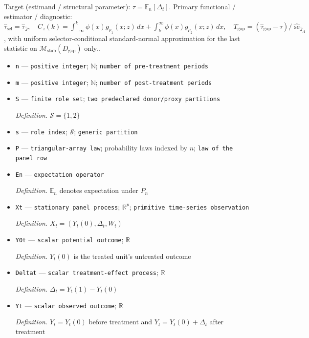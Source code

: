 \documentclass{article}
\begin{document}
Target (estimand / structural parameter): \(\tau=\mathbb E_n[\Delta_t]\).
Primary functional / estimator / diagnostic: \(\widehat\tau_{\mathrm{sel}}=\widehat\tau_{\widehat J},\quad C_z(k)=\int_{-\infty}^{k}\phi(x)g_{\rho_1}(x;z)\,dx+\int_k^{\infty}\phi(x)g_{\rho_2}(x;z)\,dx,\quad T_{\mathrm{gap}}=(\widehat\tau_{\mathrm{gap}}-\tau)/\widehat{\operatorname{se}}_{\widehat J_A}\), with uniform selector-conditional standard-normal approximation for the last statistic on \(\mathcal M_{\mathrm{stab}}(D_{\mathrm{gap}})\) only..
\begin{itemize}
  \item \texttt{n} --- \texttt{positive integer}; \(\mathbb N\); \texttt{number of pre-\allowbreak{}treatment periods}
  \item \texttt{m} --- \texttt{positive integer}; \(\mathbb N\); \texttt{number of post-\allowbreak{}treatment periods}
  \item \texttt{S} --- \texttt{finite role set}; \texttt{two predeclared donor/\allowbreak{}proxy partitions}
  \par\smallskip\noindent\emph{Definition.} \(\mathcal S=\{1,2\}\)
  \item \texttt{s} --- \texttt{role index}; \(\mathcal S\); \texttt{generic partition}
  \item \texttt{P} --- \texttt{triangular-\allowbreak{}array law}; probability laws indexed by \(n\); \texttt{law of the panel row}
  \item \texttt{En} --- \texttt{expectation operator}
  \par\smallskip\noindent\emph{Definition.} \(\mathbb E_n\) denotes expectation under \(P_n\)
  \item \texttt{Xt} --- \texttt{stationary panel process}; \(\mathbb R^{p}\); \texttt{primitive time-\allowbreak{}series observation}
  \par\smallskip\noindent\emph{Definition.} \(X_t=(Y_t(0),\Delta_t,W_t)\)
  \item \texttt{Y0t} --- \texttt{scalar potential outcome}; \(\mathbb R\)
  \par\smallskip\noindent\emph{Definition.} \(Y_t(0)\) is the treated unit's untreated outcome
  \item \texttt{Deltat} --- \texttt{scalar treatment-\allowbreak{}effect process}; \(\mathbb R\)
  \par\smallskip\noindent\emph{Definition.} \(\Delta_t=Y_t(1)-Y_t(0)\)
  \item \texttt{Yt} --- \texttt{scalar observed outcome}; \(\mathbb R\)
  \par\smallskip\noindent\emph{Definition.} \(Y_t=Y_t(0)\) before treatment and \(Y_t=Y_t(0)+\Delta_t\) after treatment

\end{itemize}
\end{document}
